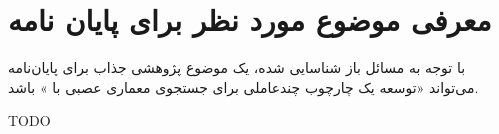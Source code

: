 

\section{معرفی موضوع مورد نظر برای پایان نامه}
با توجه به مسائل باز شناسایی شده، یک موضوع پژوهشی جذاب برای پایان‌نامه می‌تواند «توسعه یک چارچوب چندعاملی  برای جستجوی معماری عصبی با » باشد.

TODO

